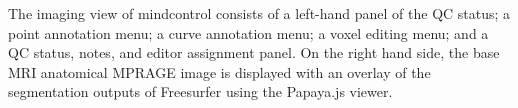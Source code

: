 \label{fig:imagingview}
The imaging view of mindcontrol consists of a left-hand panel of the QC status; a point annotation menu; a curve annotation menu; a voxel editing menu; and a QC status, notes, and editor assignment panel. On the right hand side, the base MRI anatomical MPRAGE image is displayed with an overlay of the segmentation outputs of Freesurfer using the Papaya.js viewer. 